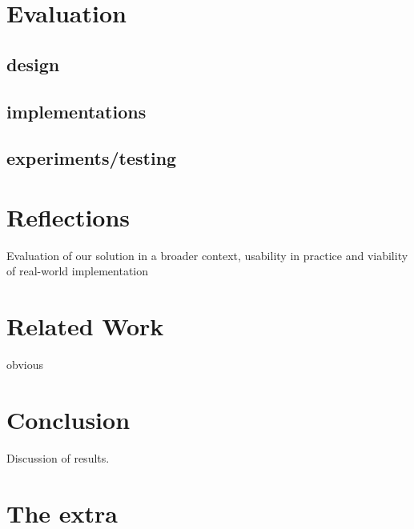 \documentclass[a4paper,10pt,openright]{memoir}
\begin{document}
\chapter{Evaluation}

\section{design}
\section{implementations}
\section{experiments/testing}

\chapter{Reflections}

Evaluation of our solution in a broader context, usability in practice 
and viability of real-world implementation

\chapter{Related Work}

obvious

\chapter{Conclusion}

Discussion of results.



\cleardoublepage
\renewcommand{\sc}[1]{\textsc{#1}}
\nocite{*}




\cleardoublepage
\appendix

\renewcommand{\thesection}{\thechapter\arabic{section}}

\chapter{The extra}


\newpage ~
\thispagestyle{empty}
\end{document}
